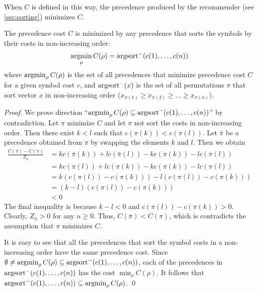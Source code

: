 When $C$ is defined in this way,
the precedence produced by the recommender (see \cref{sec:sorting}) minimizes $C$.

\begin{lemma}
The precedence cost $C$ is minimized by any precedence that sorts the symbols by their costs in non-increasing order:
$$
\operatorname*{argmin}_\rho C(\rho) = \operatorname{argsort}^- (c(1), \ldots, c(n))
$$
where
$\operatorname*{argmin}_\rho C(\rho)$ is the set of all precedences that minimize precedence cost $C$ for a given symbol cost $c$, and
$\operatorname{argsort}^-(x)$ is the set of all permutations $\pi$
that sort vector $x$ in non-increasing order ($x_{\pi(1)} \geq x_{\pi(2)} \geq \ldots \geq x_{\pi(n)}$).
\end{lemma}

\begin{proof}
We prove direction ``$\operatorname*{argmin}_\rho C(\rho) \subseteq \operatorname{argsort}^- (c(1), \ldots, c(n))$'' by contradiction.
Let $\pi$ minimize $C$ and let $\pi$ not sort the costs in non-increasing order.
Then there exist $k < l$ such that $c(\pi(k)) < c(\pi(l))$.
Let $\bar{\pi}$ be a precedence obtained from $\pi$ by swapping the elements $k$ and $l$.
Then we obtain
\begin{align*}
\frac{C(\bar{\pi}) - C(\pi)}{Z_n}
&= kc(\bar{\pi}(k)) + lc(\bar{\pi}(l)) - kc(\pi(k)) - lc(\pi(l)) \\
&= kc(\pi(l)) + lc(\pi(k)) - kc(\pi(k)) - lc(\pi(l)) \\
&= k(c(\pi(l)) - c(\pi(k))) - l(c(\pi(l)) - c(\pi(k))) \\
&= (k-l) (c(\pi(l)) - c(\pi(k))) \\
&< 0
\end{align*}
The final inequality is because $k-l < 0$ and $c(\pi(l)) - c(\pi(k)) > 0$.
Clearly, $Z_n > 0$ for any $n \geq 0$.
Thus, $C(\bar{\pi}) < C(\pi)$, which is contradicts the assumption that $\pi$ minimizes $C$.

It is easy to see that all the precedences that sort the symbol costs in a non-increasing order
have the same precedence cost.
Since $\emptyset \neq \operatorname*{argmin}_\rho C(\rho) \subseteq \operatorname{argsort}^- (c(1), \ldots, c(n))$,
each of the precedences in $\operatorname{argsort}^- (c(1), \ldots, c(n))$ has the cost $\min_\rho C(\rho)$.
It follows that $\operatorname{argsort}^- (c(1), \ldots, c(n)) \subseteq \operatorname*{argmin}_\rho C(\rho)$.
\qed
\end{proof}

